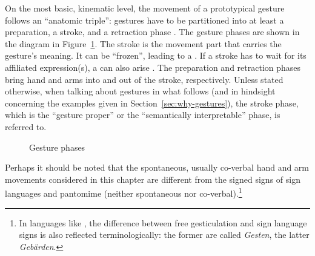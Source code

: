 \documentclass[output=paper,biblatex,babelshorthands,newtxmath,draftmode,colorlinks,citecolor=brown]{langscibook}
\begin{document}
On the most basic, kinematic level, the movement of a prototypical gesture follows an \enquote{anatomic triple}: gestures have to be partitioned into at least a preparation, a stroke, and a retraction phase \citep{Kendon:1972}.
%
The gesture phases are shown in the diagram in Figure~\ref{fig:gesture-phases}.
%
The stroke is the movement part that carries the gesture's meaning. 
%
It can be \enquote{frozen}, leading to a . 
%
If a stroke has to wait for its affiliated expression(s), a  can also arise \citep{Kita:vanGijn:vanDerHulst:1999}.
%
The preparation and retraction phases bring hand and arms into and out of the stroke, respectively. 
%
Unless stated otherwise, when talking about gestures in what follows (and in hindsight concerning the examples given in Section~\ref{sec:why-gestures}), the stroke phase, which is the \enquote{gesture proper} or the \enquote{semantically interpretable} phase, is referred to.

\begin{figure}[tb]
  \centering
  \caption{Gesture phases}
  \label{fig:gesture-phases}
\end{figure}


Perhaps it should be noted that the spontaneous, usually co-verbal hand and arm movements considered
in this chapter are different from the signed signs of sign languages 
and pantomime (neither spontaneous nor co-verbal).\footnote{In languages like , the difference between free gesticulation and sign language signs is also reflected terminologically: the former are called \textit{Gesten}, the latter \textit{Gebärden}.}
\end{document}
